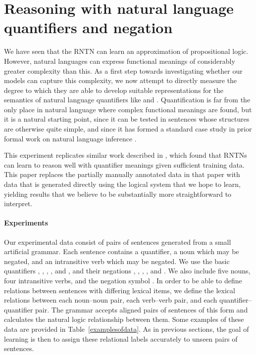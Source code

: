 \section{Reasoning with natural language quantifiers and negation}\label{sec:quantifiers}

We have seen that the RNTN can learn an approximation of propositional
logic.  However, natural languages can express functional meanings of
considerably greater complexity than this.  As a first step towards
investigating whether our models can capture this complexity, we now
attempt to directly measure the degree to which they are able to
develop suitable representations for the semantics of natural language
quantifiers like  and . Quantification is far from
the only place in natural language where complex functional meanings
are found, but it is a natural starting point, since it can be tested
in sentences whose structures are otherwise quite simple, and since it
has formed a standard case study in prior formal work on natural
language inference \cite{Icard:Moss:2013:LILT}.


This experiment replicates similar work described in
\cite{bowman2013can}, which found that RNTNs can learn to reason well
with quantifier meanings given sufficient training data. This paper
replaces the partially manually annotated data in that paper with data
that is generated directly using the logical system that we hope to
learn, yielding results that we believe to be substantially more
straightforward to interpret.

\paragraph{Experiments}
Our experimental data consist of pairs of sentences generated from a
small artificial grammar. Each sentence contains a quantifier, a noun
which may be negated, and an intransitive verb which may be
negated. We use the basic quantifiers , , ,
, and , and their negations , ,
, , and . We also
include five nouns, four intransitive verbs, and the negation symbol
. In order to be able to define relations between sentences
with differing lexical items, we define the lexical relations between
each noun--noun pair, each verb--verb pair, and each
quantifier--quantifier pair. The grammar accepts aligned pairs of
sentences of this form and calculates the natural logic relationship
between them.  Some examples of these data are provided in
Table~\ref{examplesofdata}.  As in previous sections, the goal of
learning is then to assign these relational labels accurately to
unseen pairs of sentences.


